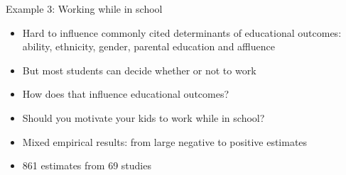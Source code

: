 \documentclass{beamer} %
\begin{document}

\begin{frame}{Example 3: Working while in school}
\begin{itemize}
	\item  Hard to influence commonly cited determinants of educational outcomes: ability, ethnicity, gender, parental
education and affluence
\item But most students can decide whether or not to work
\item How does that influence educational outcomes?
\item Should you motivate your kids to work while in school?
\item Mixed empirical results: from large negative to positive estimates	
	\item 861 estimates from 69 studies
\end{itemize}
\end{frame}
\end{document}
